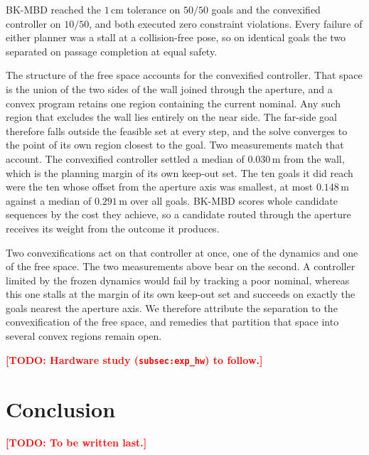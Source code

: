 \documentclass[letterpaper,10pt,conference]{ieeeconf}
\newcommand{\todo}[1]{\textcolor{red}{\textbf{[TODO: #1]}}}
\newcommand{\bkmbd}{\textsc{BK-MBD}}
\begin{document}
\bkmbd{} reached the $1$\,cm tolerance on $50/50$ goals and the convexified controller on $10/50$, and both executed zero constraint violations.
Every failure of either planner was a stall at a collision-free pose, so on identical goals the two separated on passage completion at equal safety.

The structure of the free space accounts for the convexified controller.
That space is the union of the two sides of the wall joined through the aperture, and a convex program retains one region containing the current nominal.
Any such region that excludes the wall lies entirely on the near side.
The far-side goal therefore falls outside the feasible set at every step, and the solve converges to the point of its own region closest to the goal.
Two measurements match that account.
The convexified controller settled a median of $0.030$\,m from the wall, which is the planning margin of its own keep-out set.
The ten goals it did reach were the ten whose offset from the aperture axis was smallest, at most $0.148$\,m against a median of $0.291$\,m over all goals.
\bkmbd{} scores whole candidate sequences by the cost they achieve, so a candidate routed through the aperture receives its weight from the outcome it produces.

Two convexifications act on that controller at once, one of the dynamics and one of the free space.
The two measurements above bear on the second.
A controller limited by the frozen dynamics would fail by tracking a poor nominal, whereas this one stalls at the margin of its own keep-out set and succeeds on exactly the goals nearest the aperture axis.
We therefore attribute the separation to the convexification of the free space, and remedies that partition that space into several convex regions remain open.

\todo{Hardware study (\texttt{subsec:exp\_hw}) to follow.}

\section{Conclusion}\label{sec:conclusion}

\todo{To be written last.}



\end{document}
